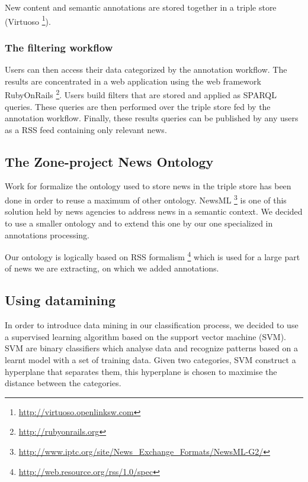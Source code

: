 \documentclass{llncs}
\begin{document}
New content and semantic annotations are stored together in a triple store (Virtuoso \footnote{\url{http://virtuoso.openlinksw.com}}). 


 
\subsubsection{The filtering workflow}
Users can then access their data categorized by the annotation workflow. The results are concentrated in a web application using the web framework RubyOnRails \footnote{\url{http://rubyonrails.org}}. Users build filters that are stored and applied as SPARQL queries. These queries are then performed over the triple store fed by the annotation workflow. Finally, these results queries can be published by any users as a RSS feed containing only relevant news.

%
\subsection{The Zone-project News Ontology}
Work for formalize the ontology used to store news in the triple store has been done in order to reuse a maximum of other ontology. 
NewsML \footnote{\url{http://www.iptc.org/site/News\_Exchange\_Formats/NewsML-G2/}} is one of this solution held by news agencies to address news in a semantic context. We decided to use a smaller ontology and to extend this one by our one specialized in annotations processing. 

Our ontology is logically based on RSS formalism \footnote{\url{http://web.resource.org/rss/1.0/spec}}  which is used for a large part of news we are extracting, on which we added annotations.

%


%

%
\subsection{Using datamining}

In order to introduce data mining in our classification process, we decided to use a supervised learning algorithm based on the support vector machine (SVM). SVM are binary classifiers which analyse data and recognize patterns based on a learnt model with a set of training data. Given two categories, SVM construct a hyperplane that separates them, this hyperplane is chosen to maximise the distance between the categories.
\end{document}
